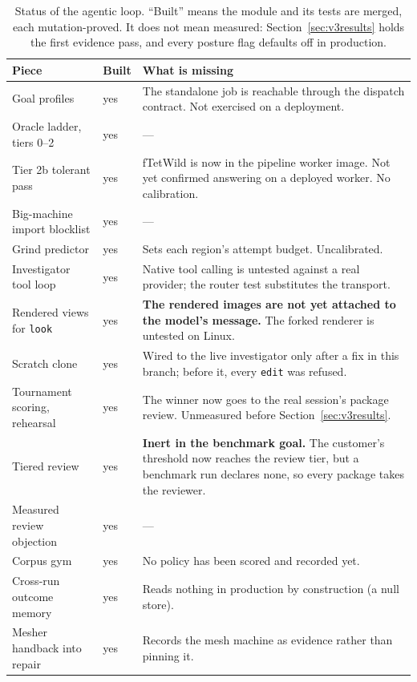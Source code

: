 \documentclass[10pt,onecolumn]{article}
\newcommand{\code}[1]{\texttt{\small #1}}
\begin{document}
\begin{table}[h]
\centering
\caption{Status of the agentic loop. ``Built'' means the module and its tests are merged, each
mutation-proved. It does not mean measured: Section~\ref{sec:v3results} holds the first evidence
pass, and every posture flag defaults off in production.}
\label{tab:v3status}
\footnotesize
\begin{tabularx}{\textwidth}{@{}L{42mm} l X@{}}
\toprule
\textbf{Piece} & \textbf{Built} & \textbf{What is missing}\\
\midrule
Goal profiles                  & yes & The standalone job is reachable through the dispatch contract. Not exercised on a deployment.\\
Oracle ladder, tiers 0--2      & yes & ---\\
Tier 2b tolerant pass          & yes & fTetWild is now in the pipeline worker image. Not yet confirmed answering on a deployed worker. No calibration.\\
Big-machine import blocklist   & yes & ---\\
Grind predictor                & yes & Sets each region's attempt budget. Uncalibrated.\\
Investigator tool loop         & yes & Native tool calling is untested against a real provider; the router test substitutes the transport.\\
Rendered views for \code{look} & yes & \textbf{The rendered images are not yet attached to the model's message.} The forked renderer is untested on Linux.\\
Scratch clone                  & yes & Wired to the live investigator only after a fix in this branch; before it, every \code{edit} was refused.\\
Tournament scoring, rehearsal  & yes & The winner now goes to the real session's package review. Unmeasured before Section~\ref{sec:v3results}.\\
Tiered review                  & yes & \textbf{Inert in the benchmark goal.} The customer's threshold now reaches the review tier, but a benchmark run declares none, so every package takes the reviewer.\\
Measured review objection      & yes & ---\\
Corpus gym                     & yes & No policy has been scored and recorded yet.\\
Cross-run outcome memory       & yes & Reads nothing in production by construction (a null store).\\
Mesher handback into repair    & yes & Records the mesh machine as evidence rather than pinning it.\\
\bottomrule
\end{tabularx}
\end{table}
\end{document}
